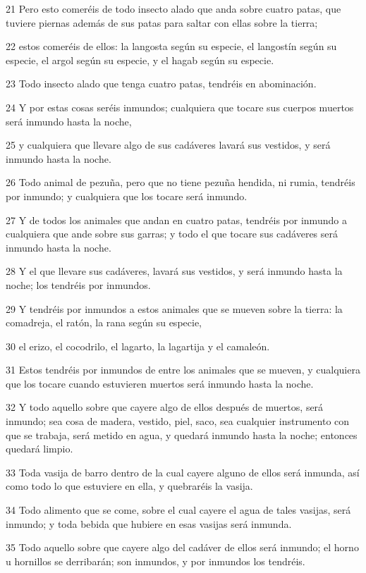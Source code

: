 \par 21 Pero esto comeréis de todo insecto alado que anda sobre cuatro patas, que tuviere piernas además de sus patas para saltar con ellas sobre la tierra;
\par 22 estos comeréis de ellos: la langosta según su especie, el langostín según su especie, el argol según su especie, y el hagab según su especie.
\par 23 Todo insecto alado que tenga cuatro patas, tendréis en abominación.
\par 24 Y por estas cosas seréis inmundos; cualquiera que tocare sus cuerpos muertos será inmundo hasta la noche,
\par 25 y cualquiera que llevare algo de sus cadáveres lavará sus vestidos, y será inmundo hasta la noche.
\par 26 Todo animal de pezuña, pero que no tiene pezuña hendida, ni rumia, tendréis por inmundo; y cualquiera que los tocare será inmundo.
\par 27 Y de todos los animales que andan en cuatro patas, tendréis por inmundo a cualquiera que ande sobre sus garras; y todo el que tocare sus cadáveres será inmundo hasta la noche.
\par 28 Y el que llevare sus cadáveres, lavará sus vestidos, y será inmundo hasta la noche; los tendréis por inmundos.
\par 29 Y tendréis por inmundos a estos animales que se mueven sobre la tierra: la comadreja, el ratón, la rana según su especie,
\par 30 el erizo, el cocodrilo, el lagarto, la lagartija y el camaleón.
\par 31 Estos tendréis por inmundos de entre los animales que se mueven, y cualquiera que los tocare cuando estuvieren muertos será inmundo hasta la noche.
\par 32 Y todo aquello sobre que cayere algo de ellos después de muertos, será inmundo; sea cosa de madera, vestido, piel, saco, sea cualquier instrumento con que se trabaja, será metido en agua, y quedará inmundo hasta la noche; entonces quedará limpio.
\par 33 Toda vasija de barro dentro de la cual cayere alguno de ellos será inmunda, así como todo lo que estuviere en ella, y quebraréis la vasija.
\par 34 Todo alimento que se come, sobre el cual cayere el agua de tales vasijas, será inmundo; y toda bebida que hubiere en esas vasijas será inmunda.
\par 35 Todo aquello sobre que cayere algo del cadáver de ellos será inmundo; el horno u hornillos se derribarán; son inmundos, y por inmundos los tendréis.
